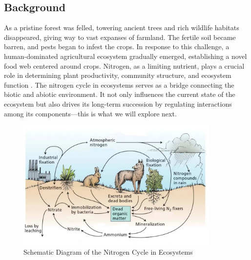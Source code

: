 \documentclass{mcmthesis}
\begin{document}
\subsection{Background}
As a pristine forest was felled, towering ancient trees and rich wildlife habitats disappeared, giving way to vast expanses of farmland. The fertile soil became barren, and pests began to infest the crops. In response to this challenge, a human-dominated agricultural ecosystem gradually emerged, establishing a novel food web centered around crops. Nitrogen, as a limiting nutrient, plays a crucial role in determining plant productivity, community structure, and ecosystem function \cite{lebauer2008nitrogen}. The nitrogen cycle in ecosystems serves as a bridge connecting the biotic and abiotic environment. It not only influences the current state of the ecosystem but also drives its long-term succession by regulating interactions among its components—this is what we will explore next.
\begin{figure}[h] 
\centering
\includegraphics[width=10cm]{figures/background.jpg}
\caption{Schematic Diagram of the Nitrogen Cycle in Ecosystems}
\label{fig:background1}
\end{figure}
\end{document}
